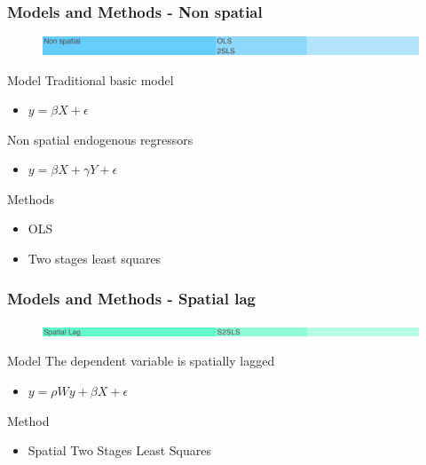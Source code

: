 \documentclass[nototal]{beamer}
\begin{document}
\begin{frame}
	\frametitle{Models and Methods - Non spatial}
  \begin{figure}
  \includegraphics[width=1\linewidth]{figs/models_non_spatial.png}
  \end{figure}
 
\begin{block}{Model}
  Traditional basic model
 \begin{itemize}
 \item  $y = \beta X + \epsilon$
 \end{itemize}
  Non spatial endogenous regressors
 \begin{itemize}
 \item  $y = \beta X + \gamma Y + \epsilon$
 \end{itemize}
 \end{block} 
\begin{block}{Methods}
 \begin{itemize}
 \item  OLS
 \item  Two stages least squares
 \end{itemize}
 \end{block} \end{frame} 

\begin{frame}
	\frametitle{Models and Methods - Spatial lag}
  \begin{figure}
  \includegraphics[width=1\linewidth]{figs/models_sl.png}
  \end{figure}
 
\begin{block}{Model}
  The dependent variable is spatially lagged
 \begin{itemize}
 \item  $y = \rho W y + \beta X + \epsilon$
 \end{itemize}
 \end{block} 
\begin{block}{Method}
 \begin{itemize}
 \item  Spatial Two Stages Least Squares
 \end{itemize}
 \end{block} \end{frame} 
\end{document}
